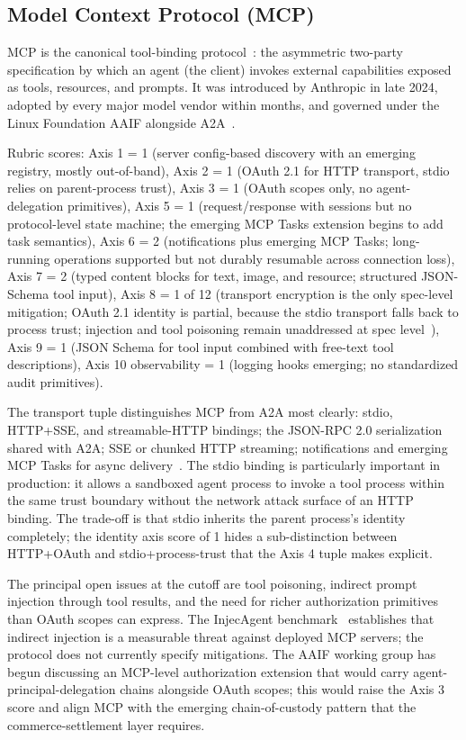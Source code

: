 \subsection{Model Context Protocol (MCP)}
\label{sec:industry:mcp}

MCP is the canonical tool-binding
protocol~\cite{spec_mcp}: the asymmetric two-party
specification by which an agent (the client) invokes
external capabilities exposed as tools, resources, and
prompts. It was introduced by Anthropic in late 2024,
adopted by every major model vendor within months, and
governed under the Linux Foundation AAIF alongside
A2A~\cite{lf_aaif}.

Rubric scores: Axis 1 = 1 (server config-based discovery
with an emerging registry, mostly out-of-band), Axis 2 = 1
(OAuth 2.1 for HTTP transport, stdio relies on parent-process
trust), Axis 3 = 1 (OAuth scopes only, no agent-delegation
primitives), Axis 5 = 1 (request/response with sessions
but no protocol-level state machine; the emerging MCP Tasks
extension begins to add task semantics), Axis 6 = 2
(notifications plus emerging MCP Tasks; long-running
operations supported but not durably resumable across
connection loss), Axis 7 = 2 (typed content blocks for
text, image, and resource; structured JSON-Schema tool
input), Axis 8 = 1 of 12 (transport encryption is the
only spec-level mitigation; OAuth 2.1 identity is partial,
because the stdio transport falls back to process trust;
injection and tool poisoning remain
unaddressed at spec level~\cite{zhan2024injecagent,
protocol_exploits}), Axis 9 = 1 (JSON Schema for tool
input combined with free-text tool descriptions),
Axis 10 observability = 1 (logging hooks emerging; no
standardized audit primitives).

The transport tuple distinguishes MCP from A2A most
clearly: stdio, HTTP+SSE, and streamable-HTTP bindings; the
JSON-RPC 2.0 serialization shared with A2A; SSE or chunked
HTTP streaming; notifications and emerging MCP Tasks for
async delivery~\cite{spec_mcp}. The stdio binding is
particularly important in production: it allows a sandboxed
agent process to invoke a tool process within the same
trust boundary without the network attack surface of an
HTTP binding. The trade-off is that stdio inherits the
parent process's identity completely; the identity axis
score of 1 hides a sub-distinction between HTTP+OAuth and
stdio+process-trust that the Axis 4 tuple makes explicit.

The principal open issues at the cutoff are tool poisoning,
indirect prompt injection through tool results, and the
need for richer authorization primitives than OAuth
scopes can express. The InjecAgent
benchmark~\cite{zhan2024injecagent} establishes that
indirect injection is a measurable threat against deployed
MCP servers; the protocol does not currently specify
mitigations. The AAIF working group has begun discussing
an MCP-level authorization extension that would carry
agent-principal-delegation chains alongside OAuth scopes;
this would raise the Axis 3 score and align MCP with the
emerging chain-of-custody pattern that the
commerce-settlement layer requires.

